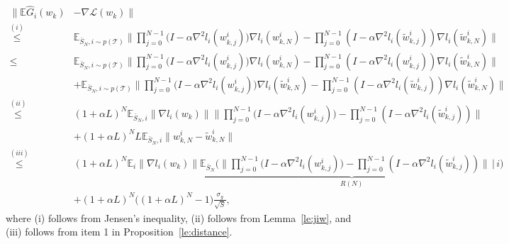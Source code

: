 \documentclass{osudissert96}
\begin{document}
	{\small	\begin{align}\label{eq:ek}
	\|\mathbb{E} \widehat G_i(w_k)&  - \nabla \mathcal{L}(w_k)\|  \nonumber
	\\ \overset{(i)}\leq & \mathbb{E}_{\bar S_N,  i\sim p(\mathcal{T})} \Big \|  \prod_{j=0}^{N-1}  \big(I - \alpha \nabla^2 l_i(w_{k,j}^i)\big)  \nabla l_i(w_{k,N}^i)  -   \prod_{j=0}^{N-1}(I-\alpha \nabla^2 l_i(\widetilde w^i_{k,j}))\nabla l_i(\widetilde w^i _{k,N})  \Big  \|  \nonumber
	\\ \leq &  \mathbb{E}_{\bar S_N,  i\sim p(\mathcal{T})} \Big \|  \prod_{j=0}^{N-1}  \big(I - \alpha \nabla^2 l_i(w_{k,j}^i)\big)  \nabla l_i(w_{k,N}^i)  -   \prod_{j=0}^{N-1}(I-\alpha \nabla^2 l_i(w^i_{k,j}))\nabla l_i(\widetilde w^i _{k,N})  \Big  \| \nonumber
	\\ &+ \mathbb{E}_{\bar S_N,  i\sim p(\mathcal{T})} \Big \|  \prod_{j=0}^{N-1}  \big(I - \alpha \nabla^2 l_i(w_{k,j}^i)\big)  \nabla l_i(\widetilde w_{k,N}^i)  -   \prod_{j=0}^{N-1}(I-\alpha \nabla^2 l_i(\widetilde w^i_{k,j}))\nabla l_i(\widetilde w^i _{k,N})  \Big  \| \nonumber
	\\ \overset{(ii)}\leq & 
	 (1+\alpha L)^N  \mathbb{E}_{\bar S_N,  i} \big\| \nabla l_i( w_{k}) \big \|   \Big \|  \prod_{j=0}^{N-1}  \big(I - \alpha \nabla^2 l_i(w_{k,j}^i)\big) -   \prod_{j=0}^{N-1}(I-\alpha \nabla^2 l_i(\widetilde w^i_{k,j})) \Big  \|   
\nonumber
	\\ &+   (1+\alpha L)^N L\mathbb{E}_{\bar S_N,  i} \big \| w_{k,N}^i  - \widetilde w^i _{k,N}  \big  \|    \nonumber
	\\\overset{(iii)}\leq & (1+\alpha L)^N  \mathbb{E}_{ i} \big\| \nabla l_i( w_{k}) \big \|   \underbrace{\mathbb{E}_{\bar S_N} \Big( \Big \|  \prod_{j=0}^{N-1}  \big(I - \alpha \nabla^2 l_i(w_{k,j}^i)\big) -   \prod_{j=0}^{N-1}(I-\alpha \nabla^2 l_i(\widetilde w^i_{k,j})) \Big  \|\, \Big |\, i \Big)}_{R(N)}    \nonumber
	\\ &+  (1+\alpha L)^N ((1+\alpha L)^N -1\big)  \frac{\sigma_g}{\sqrt{S}},  
	\end{align}}
\hspace{-0.2cm} where (i) follows from Jensen's inequality,  (ii) follows from Lemma~\ref{le:jiw}, and (iii) follows from item 1 in Proposition~\ref{le:distance}. 
\end{document}
